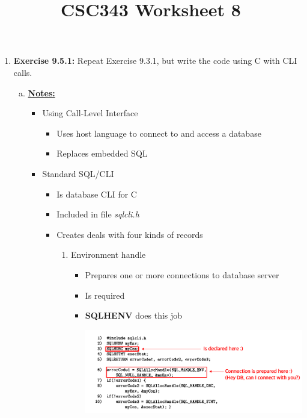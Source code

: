 \documentclass[12pt]{article}
\begin{document}
\title{CSC343 Worksheet 8}
\maketitle

\begin{enumerate}[1.]
    \item \textbf{Exercise 9.5.1:} Repeat Exercise 9.3.1, but write the code using C with CLI calls.

    \bigskip

    \begin{enumerate}[a)]
        \item

        \bigskip

        \underline{\textbf{Notes:}}

        \begin{itemize}
            \item Using Call-Level Interface
            \begin{itemize}
                \item Uses host language to connect to and access a database
                \item Replaces embedded SQL
            \end{itemize}
            \item Standard SQL/CLI
            \begin{itemize}
                \item Is database CLI for C
                \item Included in file \textit{sqlcli.h}
                \item Creates deals with four kinds of records

                \bigskip

                \begin{enumerate}[1.]
                    \item Environment handle
                    \begin{itemize}
                        \item Prepares one or more connections to database server
                        \item Is required
                        \item \textbf{SQLHENV} does this job

                        \begin{center}
                        \includegraphics[width=\linewidth]{images/worksheet_8_solution_1.png}
                        \end{center}


\end{itemize}
\end{enumerate}
\end{itemize}
\end{itemize}
\end{enumerate}
\end{enumerate}
\end{document}
